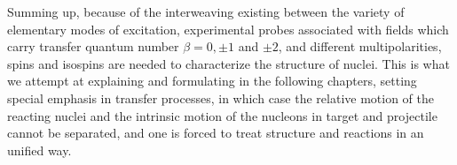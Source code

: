 Summing up, because of the interweaving existing between the variety of elementary modes of excitation, experimental probes associated with fields which carry transfer quantum number $\beta=0, \pm 1$ and $\pm2$, and different multipolarities, spins and isospins are needed to characterize the structure of nuclei. This is what we attempt at explaining and formulating in the following chapters, setting special emphasis in transfer processes, in which case the relative motion of the reacting nuclei and the intrinsic motion of the nucleons in target and projectile cannot be separated, and one is forced to treat structure and reactions in an unified way.









%

%

